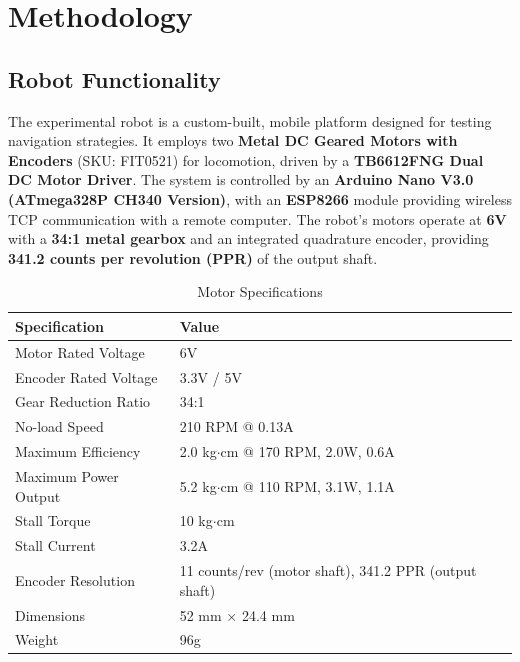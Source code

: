 \section{Methodology}
\subsection{Robot Functionality}

The experimental robot is a custom-built, mobile platform designed for testing navigation strategies. 
It employs two \textbf{Metal DC Geared Motors with Encoders} (SKU: FIT0521) for locomotion, driven by a \textbf{TB6612FNG Dual DC Motor Driver}. 
The system is controlled by an \textbf{Arduino Nano V3.0 (ATmega328P CH340 Version)}, with an 	\textbf{ESP8266} module providing wireless TCP communication with a remote computer.
The robot's motors operate at \textbf{6V} with a \textbf{34:1 metal gearbox} and an integrated quadrature encoder, providing \textbf{341.2 counts per revolution (PPR)} of the output shaft.

\begin{table}[h]
    \centering
    \begin{tabular}{ll}
        \toprule
        \textbf{Specification} & \textbf{Value} \\
        \midrule
        Motor Rated Voltage & 6V \\
        Encoder Rated Voltage & 3.3V / 5V \\
        Gear Reduction Ratio & 34:1 \\
        No-load Speed & 210 RPM @ 0.13A \\
        Maximum Efficiency & 2.0 kg$\cdot$cm @ 170 RPM, 2.0W, 0.6A \\
        Maximum Power Output & 5.2 kg$\cdot$cm @ 110 RPM, 3.1W, 1.1A \\
        Stall Torque & 10 kg$\cdot$cm \\
        Stall Current & 3.2A \\
        Encoder Resolution & 11 counts/rev (motor shaft), 341.2 PPR (output shaft) \\
        Dimensions & 52 mm $\times$ 24.4 mm \\
        Weight & 96g \\
        \bottomrule
    \end{tabular}
    \caption{Motor Specifications}
    \label{tab:motor_specs}
\end{table}



